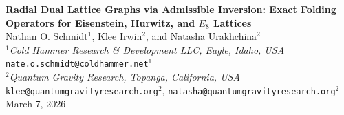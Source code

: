 \documentclass{article}
\begin{document}
\begin{center}
 {\fontsize{18}{20}\selectfont\bfseries Radial Dual Lattice Graphs via Admissible Inversion: Exact Folding Operators for Eisenstein, Hurwitz, and $E_8$ Lattices}\\[1.2em]
Nathan O. Schmidt$^{1}$, Klee Irwin$^{2}$, and Natasha Urakhchina$^{2}$ \\[0.6em]
\textit{$^{1}$Cold Hammer Research \& Development LLC, Eagle, Idaho, USA} \\[0.1em]
\texttt{nate.o.schmidt@coldhammer.net}$^{1}$ \\[0.4em]
\textit{$^{2}$Quantum Gravity Research, Topanga, California, USA} \\[0.1em]
\texttt{klee@quantumgravityresearch.org}$^{2}$, \texttt{natasha@quantumgravityresearch.org}$^{2}$ \\[0.6em]
March 7, 2026
\end{center}
\end{document}
